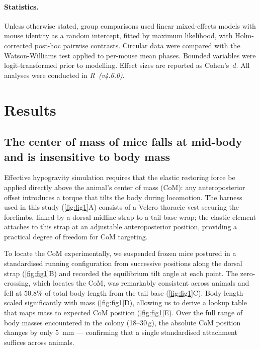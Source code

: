 \documentclass[blue]{enslyonstage}
\begin{document}
\paragraph{Statistics.}
Unless otherwise stated, group comparisons used linear mixed-effects models
with mouse identity as a random intercept, fitted by maximum
likelihood\cite{batesFittingLinearMixedEffects2015}, with Holm-corrected
post-hoc pairwise contrasts\cite{lenthEmmeansEstimatedMarginal2017}. Circular
data were compared with the Watson-Williams
test\cite{mardiaDirectionalStatistics1999} applied to per-mouse mean phases.
Bounded variables were logit-transformed prior to modelling. Effect sizes are
reported as Cohen's~$d$. All analyses were conducted in \textit{R~(v4.6.0)}.

\section{Results}
\label{sec:results}
%

\subsection{The center of mass of mice falls at mid-body and is insensitive to body mass}

Effective hypogravity simulation requires that the elastic restoring force be
applied directly above the animal's center of mass (CoM): any anteroposterior
offset introduces a torque that tilts the body during locomotion. The harness
used in this study (\autoref{fig:fig1}A) consists of a Velcro thoracic vest
securing the forelimbs, linked by a dorsal midline strap to a tail-base wrap;
the elastic element attaches to this strap at an adjustable anteroposterior
position, providing a practical degree of freedom for CoM targeting.

To locate the CoM experimentally, we suspended frozen mice postured in a
standardised running configuration from successive positions along the dorsal
strap (\autoref{fig:fig1}B) and recorded the equilibrium tilt angle at each
point. The zero-crossing, which locates the CoM, was remarkably consistent
across animals and fell at $50.8\%$ of total body length from the tail base
(\autoref{fig:fig1}C). Body length scaled significantly with mass
(\autoref{fig:fig1}D), allowing us to derive a lookup table that maps mass to
expected CoM position (\autoref{fig:fig1}E). Over the full range of body masses
encountered in the colony (18--30\,g), the absolute CoM position changes by
only \qty{5}{\milli\metre} --- confirming that a single standardised attachment
suffices across animals.
\end{document}

